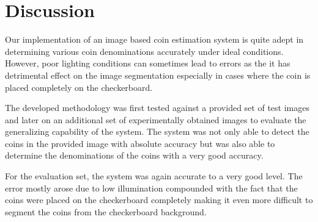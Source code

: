 \documentclass[report.tex]{subfile}
\begin{document}
\section{Discussion}

Our implementation of an image based coin estimation system is quite adept in
determining various coin denominations accurately under ideal conditions.
However, poor lighting conditions can sometimes lead to errors
as the it has detrimental effect on the image segmentation especially in cases
where the coin is placed completely on the checkerboard.

The developed methodology was first tested against a provided set of test
images and later on an additional set of experimentally obtained images to
evaluate the generalizing capability of the system. The system was not only
able to detect the coins in the provided image with absolute accuracy but was
also able to determine the denominations of the coins with a very good
accuracy.

For the evaluation set, the system was again accurate to a very good level. The 
error mostly arose due to low illumination compounded with 
the fact that the coins were placed on the checkerboard completely
making it even more difficult to segment the coins from the checkerboard background. 
 
\end{document}
